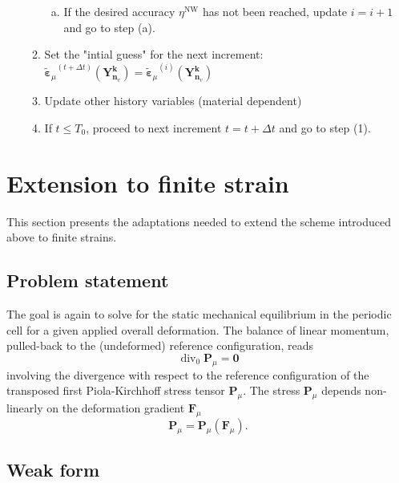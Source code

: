 \begin{framedbox}[htb]
\begin{center}
\begin{minipage}{0.9\textwidth}
\begin{enumerate}[(i)]
\begin{enumerate}[(1)]
\begin{enumerate}[(a)]
  \item If the desired accuracy \(\eta^{\mathrm{NW}}\) has not been reached, update \(i=i+1\) and go to step (a).
  \end{enumerate}
\item Set the "intial guess" for the next increment: \({\tilde{\bm\varepsilon}_\mu}^{(t+\Delta t)}\left(\bm{Y}_{\bm n_v}^{\bm  k}\right)={\tilde{\bm\varepsilon}_\mu}^{(i)}\left(\bm{Y}_{\bm n_v}^{\bm  k}\right)\)
\item Update other history variables (material dependent)
\item If \(t\leq T_0\), proceed to next increment \(t=t+\Delta t\) and go to step (1).
\end{enumerate}
\end{enumerate}
\end{minipage}
\end{center}
\end{framedbox}


\section{Extension to finite strain}

This section presents the adaptations needed to extend the scheme introduced above to finite strains.

\subsection{Problem statement}

The goal is again to solve for the static mechanical equilibrium in the periodic cell for a given applied overall deformation.
The balance of linear momentum, pulled-back to the (undeformed) reference configuration, reads
\begin{equation} \label{eq:equilibrium_equation_finite_strain}
\operatorname{div}_0 \bm{P}_\mu=\bm{0}
\end{equation}
involving the divergence with respect to the reference configuration of the transposed first Piola-Kirchhoff stress tensor \(\bm{P}_\mu\).
The stress \(\bm{P}_\mu\) depends non-linearly on the deformation gradient \(\bm{F}_\mu\)
\begin{equation} \label{eq:constitutive_law_finite_strains}
\bm{P}_\mu=\bm{P}_\mu(\bm{F}_\mu).
\end{equation}

\subsection{Weak form}

